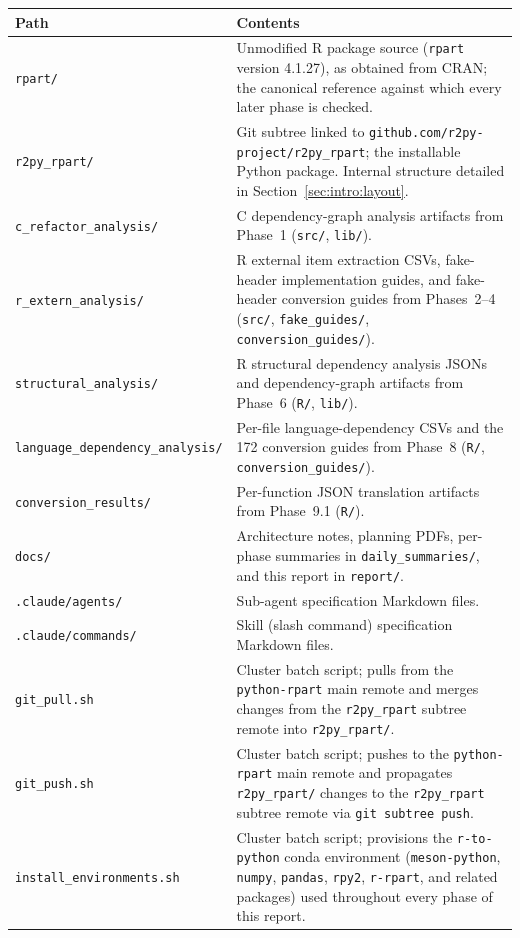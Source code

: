 \documentclass[12pt]{article}
\begin{document}
\medskip
\begin{center}
\begin{tabular}{p{}p{}}
\toprule
Path & Contents \\
\midrule
\texttt{rpart/} & Unmodified R package source (\texttt{rpart} version 4.1.27), as obtained from CRAN; the canonical reference against which every later phase is checked. \\
\texttt{r2py\_rpart/} & Git subtree linked to \texttt{github.com/r2py-project/r2py\_rpart}; the installable Python package. Internal structure detailed in Section~\ref{sec:intro:layout}. \\
\texttt{c\_refactor\_analysis/} & C dependency-graph analysis artifacts from Phase~1 (\texttt{src/}, \texttt{lib/}). \\
\texttt{r\_extern\_analysis/} & R external item extraction CSVs, fake-header implementation guides, and fake-header conversion guides from Phases~2--4 (\texttt{src/}, \texttt{fake\_guides/}, \texttt{conversion\_guides/}). \\
\texttt{structural\_analysis/} & R structural dependency analysis JSONs and dependency-graph artifacts from Phase~6 (\texttt{R/}, \texttt{lib/}). \\
\texttt{language\_dependency\_analysis/} & Per-file language-dependency CSVs and the 172 conversion guides from Phase~8 (\texttt{R/}, \texttt{conversion\_guides/}). \\
\texttt{conversion\_results/} & Per-function JSON translation artifacts from Phase~9.1 (\texttt{R/}). \\
\texttt{docs/} & Architecture notes, planning PDFs, per-phase summaries in \texttt{daily\_summaries/}, and this report in \texttt{report/}. \\
\texttt{.claude/agents/} & Sub-agent specification Markdown files. \\
\texttt{.claude/commands/} & Skill (slash command) specification Markdown files. \\
\texttt{git\_pull.sh} & Cluster batch script; pulls from the \texttt{python-rpart} main remote and merges changes from the \texttt{r2py\_rpart} subtree remote into \texttt{r2py\_rpart/}. \\
\texttt{git\_push.sh} & Cluster batch script; pushes to the \texttt{python-rpart} main remote and propagates \texttt{r2py\_rpart/} changes to the \texttt{r2py\_rpart} subtree remote via \texttt{git subtree push}. \\
\texttt{install\_environments.sh} & Cluster batch script; provisions the \texttt{r-to-python} conda environment (\texttt{meson-python}, \texttt{numpy}, \texttt{pandas}, \texttt{rpy2}, \texttt{r-rpart}, and related packages) used throughout every phase of this report. \\
\bottomrule
\end{tabular}
\end{center}
\medskip
\end{document}
